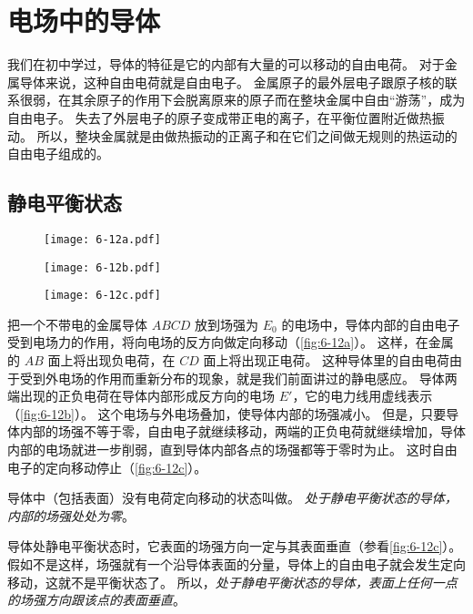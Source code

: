 \section{电场中的导体}
我们在初中学过，导体的特征是它的内部有大量的可以移动的自由电荷。
对于金属导体来说，这种自由电荷就是自由电子。
金属原子的最外层电子跟原子核的联系很弱，在其余原子的作用下会脱离原来的原子而在整块金属中自由“游荡”，成为自由电子。
失去了外层电子的原子变成带正电的离子，在平衡位置附近做热振动。
所以，整块金属就是由做热振动的正离子和在它们之间做无规则的热运动的自由电子组成的。

\subsection{静电平衡状态} 
\begin{figure}
	\begin{minipage}[b]{0.33\linewidth}\centering
	  \texttt{[image: 6-12a.pdf]}
		\subcaption{}\label{fig:6-12a}
	\end{minipage}
	\begin{minipage}[b]{0.33\linewidth}\centering
	  \texttt{[image: 6-12b.pdf]}
		\subcaption{}\label{fig:6-12b}
	\end{minipage}
	\begin{minipage}[b]{0.3\linewidth}\centering
	  \texttt{[image: 6-12c.pdf]}
		\subcaption{}\label{fig:6-12c}
	\end{minipage}
	\caption{}\label{fig:6-12}
\end{figure}

把一个不带电的金属导体 $ABCD$ 放到场强为 $E_0$ 的电场中，导体内部的自由电子受到电场力的作用，将向电场的反方向做定向移动（\cref{fig:6-12a}）。
这样，在金属的 $AB$ 面上将出现负电荷，在 $CD$ 面上将出现正电荷。
这种导体里的自由电荷由于受到外电场的作用而重新分布的现象，就是我们前面讲过的静电感应。
导体两端出现的正负电荷在导体内部形成反方向的电场 $E'$，它的电力线用虚线表示（\cref{fig:6-12b}）。
这个电场与外电场叠加，使导体内部的场强减小。
但是，只要导体内部的场强不等于零，自由电子就继续移动，两端的正负电荷就继续增加，导体内部的电场就进一步削弱，直到导体内部各点的场强都等于零时为止。
这时自由电子的定向移动停止（\cref{fig:6-12c}）。

导体中（包括表面）没有电荷定向移动的状态叫做。
\emph{处于静电平衡状态的导体，内部的场强处处为零}。

导体处静电平衡状态时，它表面的场强方向一定与其表面垂直（参看\cref{fig:6-12c}）。
假如不是这样，场强就有一个沿导体表面的分量，导体上的自由电子就会发生定向移动，这就不是平衡状态了。
所以，\emph{处于静电平衡状态的导体，表面上任何一点的场强方向跟该点的表面垂直}。

